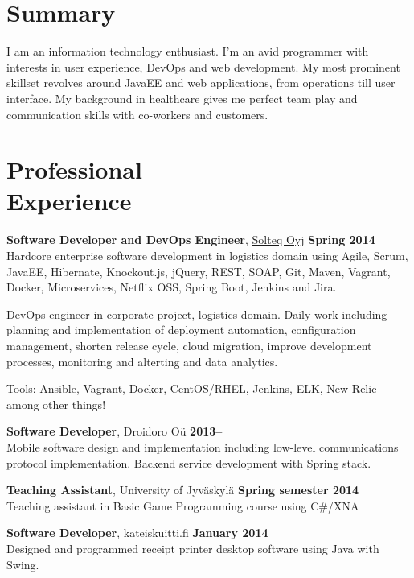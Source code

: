\documentclass[margin,line]{resume}
\begin{document}
\begin{resume}

\vspace{0.5cm}

\section{\mysidestyle Summary}
I am an information technology enthusiast. I'm an avid programmer with interests in user experience, DevOps and web development. My most prominent skillset revolves around JavaEE and web applications, from operations till user interface. My background in healthcare gives me perfect team play and communication skills with co-workers and customers.

\section{\mysidestyle Professional\\Experience}

\textbf{Software Developer and DevOps Engineer}, \href{http://www.descom.fi}{Solteq Oyj}
\hfill\textbf{Spring 2014}\\
Hardcore enterprise software development in logistics domain using Agile, Scrum, JavaEE, Hibernate, Knockout.js, jQuery, REST, SOAP, Git, Maven, Vagrant, Docker, Microservices, Netflix OSS, Spring Boot, Jenkins and Jira.

DevOps engineer in corporate project, logistics domain. Daily work including planning and implementation of deployment automation, configuration management, shorten release cycle, cloud migration, improve development processes, monitoring and alterting and data analytics.

Tools: Ansible, Vagrant, Docker, CentOS/RHEL, Jenkins, ELK, New Relic among other things!

\textbf{Software Developer}, Droidoro Oü
\hfill\textbf{2013--}\\
Mobile software design and implementation including low-level communications protocol implementation. Backend service development with Spring stack.

\textbf{Teaching Assistant}, University of Jyväskylä  
\hfill\textbf{Spring semester 2014} \\
Teaching assistant in Basic Game Programming course using C\#/XNA

\textbf{Software Developer}, kateiskuitti.fi
\hfill\textbf{January 2014} \\
Designed and programmed receipt printer desktop software using Java with Swing.


\end{resume}
\end{document}
